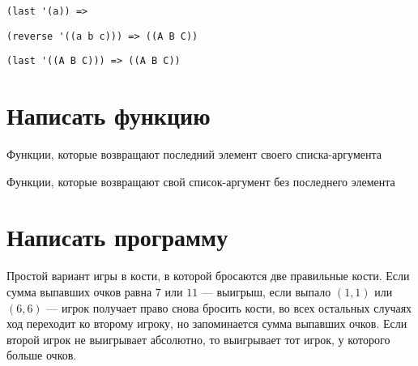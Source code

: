 \problem \hfill

\begin{lstlisting}
(last '(a)) => 
\end{lstlisting}


\problem \hfill

\begin{lstlisting}
(reverse '((a b c))) => ((A B C))
\end{lstlisting}


\problem \hfill

\begin{lstlisting}
(last '((A B C))) => ((A B C))
\end{lstlisting}



\section{Написать функцию}

\problem Функции, которые возвращают последний элемент своего списка-аргумента



\problem Функции, которые возвращают свой список-аргумент без последнего элемента




\section{Написать программу}

\problem Простой вариант игры в кости, в которой бросаются две правильные кости. Если сумма выпавших очков равна $7$ или $11$ --- выигрыш, если выпало $(1, 1)$ или $(6, 6)$ --- игрок получает право снова бросить кости, во всех остальных случаях ход переходит ко второму игроку, но запоминается сумма выпавших очков. Если второй игрок не выигрывает абсолютно, то выигрывает тот игрок, у которого больше очков.

\newpage
{}